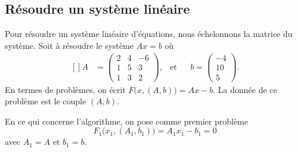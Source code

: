 \subsection{Résoudre un système linéaire}

Pour résoudre un système linéaire d'équations, nous échelonnons la matrice du système. Soit à résoudre le système $Ax=b$ où
\begin{equation}
	\begin{aligned}[]
		A&=\begin{pmatrix}
			2	&	4	&	-6	\\
			1	&	5	&	3	\\
			1	&	3	&	2
		\end{pmatrix}, &\text{et}&&b=\begin{pmatrix}
			-4	\\ 
			10	\\ 
			5	
		\end{pmatrix}.
	\end{aligned}
\end{equation}
En termes de problèmes, on écrit $F\big( x,(A,b) \big)=Ax-b$. La donnée de ce problème est le couple $(A,b)$.

En ce qui concerne l'algorithme, on pose comme premier problème
\begin{equation}
	F_1\big(x_1,(A_1,b_1)\big)=A_1x_1-b_1=0
\end{equation}
avec $A_1=A$ et $b_1=b$.

